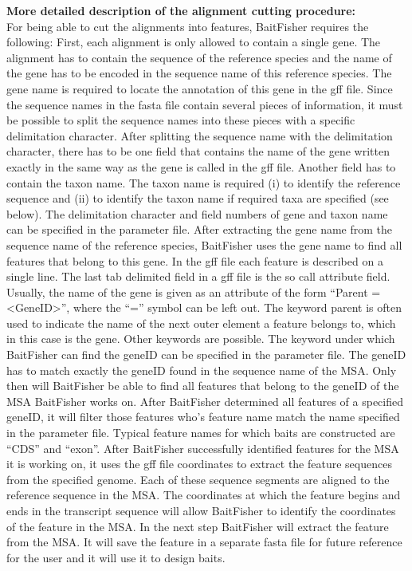 \documentclass[a4paper,pdflatex,11pt]{article}
\begin{document}
{\bf More detailed description of the alignment cutting procedure:}\\
For being able to cut the alignments into features, BaitFisher requires
the following: First, each alignment is only allowed to contain a single
gene. The alignment has to contain the sequence of the reference species
and the name of the gene has to be encoded in the sequence name of this
reference species. The gene name is required to locate the annotation of
this gene in the gff file. Since the sequence names in the fasta file contain several
pieces of information, it must be possible to split the sequence names into these pieces
with a specific delimitation character.
After splitting the sequence name with the delimitation character, there
has to be one field that contains the name of the gene written exactly in the same way as
the gene is called in the gff file. Another field has to
contain the taxon name. The taxon name is required (i) to identify the
reference sequence and (ii) to identify the taxon name if required taxa
are specified (see below). The delimitation character and field numbers
of gene and taxon name can be specified in the parameter file. After
extracting the gene name from the sequence name of the reference
species, BaitFisher uses the gene name to find all features that belong
to this gene. In the gff file each feature is described on a single
line. The last tab delimited field in a gff file is the so call
attribute field. Usually, the name of the gene is given as an attribute
of the form ``Parent = <GeneID>'', where the ``='' symbol can be left
out. The keyword parent is often used to indicate the name of the next
outer element a feature belongs to, which in this case is the gene.
Other keywords are possible. The keyword under which BaitFisher can find
the geneID can be specified in the parameter file. The geneID has to
match exactly the geneID found in the sequence name of the MSA. Only
then will BaitFisher be able to find all features that belong to the
geneID of the MSA BaitFisher works on. After BaitFisher determined all
features of a specified geneID, it will filter those features who's
feature name match the name specified in the parameter file. Typical
feature names for which baits are constructed are ``CDS'' and ``exon''.
After BaitFisher successfully identified features for the MSA it is
working on, it uses the gff file coordinates to extract the feature sequences
from the specified genome. Each of these sequence segments are aligned to the
reference sequence in the MSA. The coordinates at which the feature
begins and ends in the transcript sequence will allow BaitFisher to
identify the coordinates of the feature in the MSA. In the next step
BaitFisher will extract the feature from the MSA. It will save the
feature in a separate fasta file for future reference for the user and
it will use it to design baits.
\end{document}
